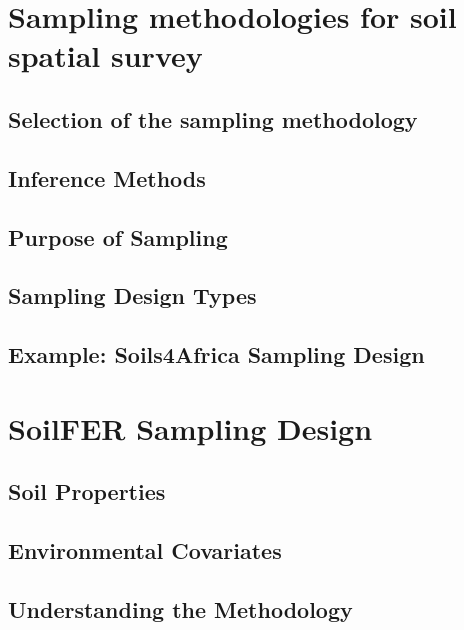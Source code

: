 \documentclass[
  10pt,
  b5paper,
  oneside]{book}
\begin{document}
\section{Sampling methodologies for soil spatial survey}\label{sampling-theory}

\subsection{Selection of the sampling methodology}\label{selection-methods}

\subsection{Inference Methods}\label{inference-methods}

\subsection{Purpose of Sampling}\label{sampling-purpose}

\subsection{Sampling Design Types}\label{design-types}

\subsection{Example: Soils4Africa Sampling Design}\label{soils4africa-example}

\section{SoilFER Sampling Design}\label{soilfer-design}

\subsection{Soil Properties}\label{soil-properties}

\subsection{Environmental Covariates}\label{env-covariates}

\subsection{Understanding the Methodology}\label{methodology}
\end{document}
